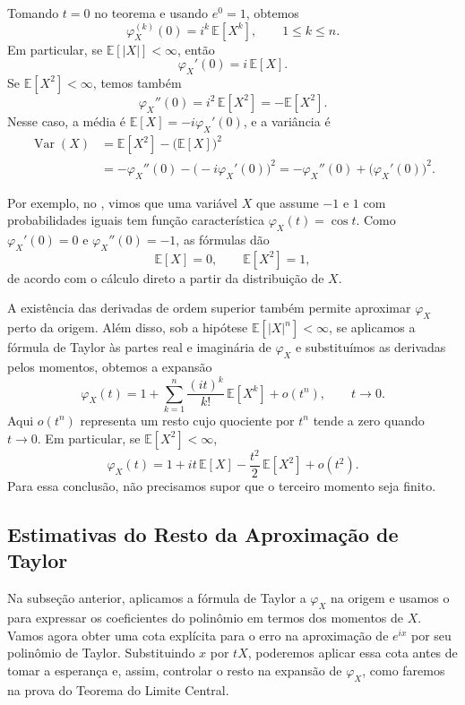 \documentclass[12pt,portuguese]{article}
\theoremstyle{definition}
\theoremstyle{plainexercise}
\theoremstyle{starredexercise}
\theoremstyle{definition}
\begin{document}
Tomando $t=0$ no teorema e usando $e^0=1$, obtemos
\[
\varphi_X^{(k)}(0)=i^k\,\mathbb{E}[X^k],
\qquad 1\leqslant k\leqslant n.
\]
Em particular, se $\mathbb{E}[|X|]<\infty$, então
\[
\varphi_X'(0)=i\,\mathbb{E}[X].
\]
Se $\mathbb{E}[X^2]<\infty$, temos também
\[
\varphi_X''(0)=i^2\,\mathbb{E}[X^2]=-\mathbb{E}[X^2].
\]
Nesse caso, a média é $\mathbb{E}[X]=-i\varphi_X'(0)$, e a variância é
\[
\begin{aligned}
\operatorname{Var}(X)
&=\mathbb{E}[X^2]-\bigl(\mathbb{E}[X]\bigr)^2
\\[0.3cm]
&=-\varphi_X''(0)-\bigl(-i\varphi_X'(0)\bigr)^2
=-\varphi_X''(0)+\bigl(\varphi_X'(0)\bigr)^2.
\end{aligned}
\]

Por exemplo, no , vimos que uma variável $X$ que assume
$-1$ e $1$ com probabilidades iguais tem função característica
$\varphi_X(t)=\cos t$. Como $\varphi_X'(0)=0$ e
$\varphi_X''(0)=-1$, as fórmulas dão
\[
\mathbb{E}[X]=0,
\qquad
\mathbb{E}[X^2]=1,
\]
de acordo com o cálculo direto a partir da distribuição de $X$.

A existência das derivadas de ordem superior também permite aproximar $\varphi_X$ perto da origem.
Além disso, sob a hipótese $\mathbb{E}[|X|^n]<\infty$, se aplicamos a fórmula de Taylor às partes real e
imaginária de $\varphi_X$ e substituímos as derivadas pelos momentos, obtemos a expansão
\[
\varphi_X(t)
=1+\sum_{k=1}^{n}\frac{(it)^k}{k!}\,\mathbb{E}[X^k]
+o(t^n),
\qquad t\to0.
\]
Aqui $o(t^n)$ representa um resto cujo quociente por $t^n$ tende a zero
quando $t\to0$. Em particular, se $\mathbb{E}[X^2]<\infty$,
\[
\varphi_X(t)
=1+it\,\mathbb{E}[X]
-\frac{t^2}{2}\,\mathbb{E}[X^2]+o(t^2).
\]
Para essa conclusão, não precisamos supor que o terceiro momento seja finito.

\subsection{Estimativas do Resto da Aproximação de Taylor}\label{subsec:resto-taylor}

Na subseção anterior, aplicamos a fórmula de Taylor a $\varphi_X$
na origem e usamos o  para expressar
os coeficientes do polinômio em termos dos momentos de $X$.
Vamos agora obter uma cota explícita para o erro na aproximação de
$e^{ix}$ por seu polinômio de Taylor. Substituindo $x$ por $tX$,
poderemos aplicar essa cota antes de tomar a esperança e, assim,
controlar o resto na expansão de $\varphi_X$, como faremos na prova
do Teorema do Limite Central.
\end{document}
